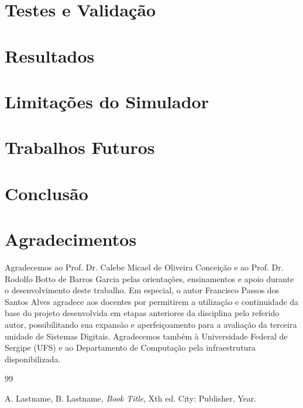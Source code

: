 \documentclass[conference]{IEEEtran}
\begin{document}
\section{Testes e Validação}



\section{Resultados}



\section{Limitações do Simulador}


\section{Trabalhos Futuros}


\section{Conclusão}


\section*{Agradecimentos}
Agradecemos ao Prof. Dr. Calebe Micael de Oliveira Conceição e ao Prof. Dr. Rodolfo Botto de Barros Garcia pelas orientações, ensinamentos e apoio durante o desenvolvimento deste trabalho. Em especial, o autor Francisco Passos dos Santos Alves agradece aos docentes por permitirem a utilização e continuidade da base do projeto desenvolvida em etapas anteriores da disciplina pelo referido autor, possibilitando sua expansão e aperfeiçoamento para a avaliação da terceira unidade de Sistemas Digitais. Agradecemos também à Universidade Federal de Sergipe (UFS) e ao Departamento de Computação pela infraestrutura disponibilizada.

\begin{thebibliography}{99}

A. Lastname, B. Lastname, \textit{Book Title}, Xth ed. City: Publisher, Year.

\end{thebibliography}
\end{document}
